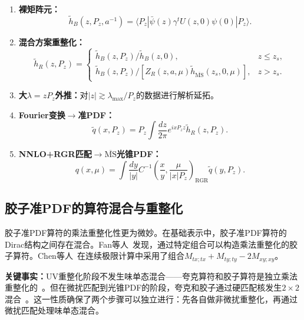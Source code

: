 \documentclass[12pt,a4paper]{ctexart}
\theoremstyle{definition}
\begin{document}
\begin{enumerate}[leftmargin=*]
    \item \textbf{裸矩阵元：}
    \begin{equation}
    \tilde h_B(z, P_z, a^{-1}) = \langle P_z | \bar\psi(z)\gamma^t U(z,0)\psi(0) | P_z \rangle.
    \end{equation}

    \item \textbf{混合方案重整化：}
    \begin{equation}
    \tilde h_R(z, P_z) = \begin{cases}
    \tilde h_B(z, P_z)/\tilde h_B(z, 0), & z \le z_s,\\
    \tilde h_B(z, P_z)/[Z_R(z, a, \mu) \tilde h_{\overline{\text{MS}}}(z_s, 0, \mu)], & z > z_s.
    \end{cases}
    \end{equation}

    \item \textbf{大$\lambda = zP_z$外推：}对$|z| \gtrsim \lambda_{\max}/P_z$的数据进行解析延拓。

    \item \textbf{Fourier变换$\to$准PDF：}
    \begin{equation}
    \tilde q(x, P_z) = P_z \int \frac{dz}{2\pi} e^{ixP_z z} \tilde h_R(z, P_z).
    \end{equation}

    \item \textbf{NNLO+RGR匹配$\to\overline{\text{MS}}$光锥PDF：}
    \begin{equation}
    q(x, \mu) = \int \frac{dy}{|y|} C^{-1}\!\left(\frac{x}{y}, \frac{\mu}{|x|P_z}\right)_{\text{RGR}} \tilde q(y, P_z).
    \end{equation}
\end{enumerate}

\subsection{胶子准PDF的算符混合与重整化}

胶子准PDF算符的乘法重整化性更为微妙。在基础表示中，胶子准PDF算符的Dirac结构之间存在混合。Fan等人~\cite{Fan2018gluonQuasi}发现，通过特定组合可以构造乘法重整化的胶子算符。Chen等人~\cite{Chen2025gluon}在连续极限计算中采用了组合$M_{tx;tx} + M_{ty;ty} - 2M_{xy;xy}$。

\textbf{关键事实：}UV重整化阶段不发生味单态混合——夸克算符和胶子算符是独立乘法重整化的~\cite{Li2019multiplicative}。但在微扰匹配到光锥PDF的阶段，夸克和胶子通过硬匹配核发生$2\times 2$混合~\cite{Yao2023connecting}。这一性质确保了两个步骤可以独立进行：先各自做非微扰重整化，再通过微扰匹配处理味单态混合。
\end{document}
